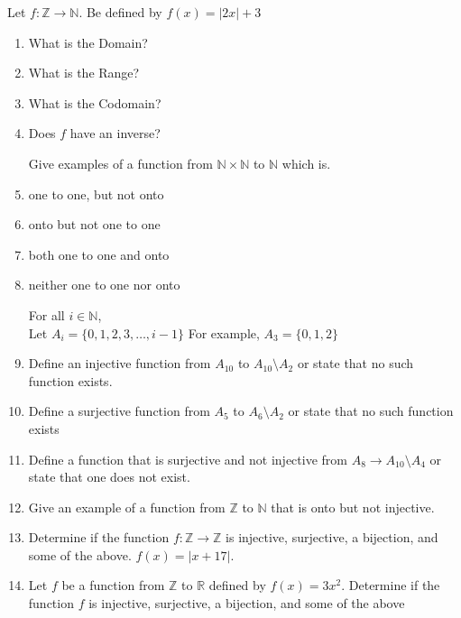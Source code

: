 \documentclass[solutions,answers]{exam}
\begin{document}
Let $f:\mathbb{Z}\to \mathbb{N}$. Be defined by $f(x)=|2x|+3$

\begin{enumerate}
\vfill
\item What is the Domain?\\
\vfill
\item What is the Range?\\
\vfill
\item What is the Codomain?\\
\vfill
\item Does $f$ have an inverse?\\
\vfill


\noindent Give examples of a function from $\mathbb{N} \times \mathbb{N}$ to $\mathbb{N}$ which is.

\item one to one, but not onto
\vfill
\item onto but not one to one
\vfill
\item both one to one and onto
\vfill
\item neither one to one nor onto
\vfill
\newpage

For all $i \in \mathbb{N}$, \\
Let $A_i=\{0,1,2,3,\ldots, i-1\}$
For example, $A_3=\{0,1,2\}$


\item Define an injective function from  $A_{10}$ to $A_{10}\setminus A_2$ or state that no such function exists.

\vfill
\item Define a surjective function from $A_5$ to $A_6\setminus A_2$ or state that no such function exists
\vfill
\item Define a function that is surjective and not injective from $A_8\to A_{10}\setminus A_4$ or state that one does not exist.
\vfill
\item Give an example of a function from $\mathbb{Z}$ to $\mathbb{N}$ that is onto but not injective.
\vfill
\item Determine if the function  $f:\mathbb{Z}\to \mathbb{Z}$ is injective, surjective, a bijection, and some of the above. $f(x)=|x+17|$.
\vfill
\item Let $f$ be a function from $\mathbb{Z}$ to $\mathbb{R}$ defined by $f(x)=3x^2$. Determine if the function  $f$ is injective, surjective, a bijection, and some of the above
\vfill
\end{enumerate}
\end{document}
